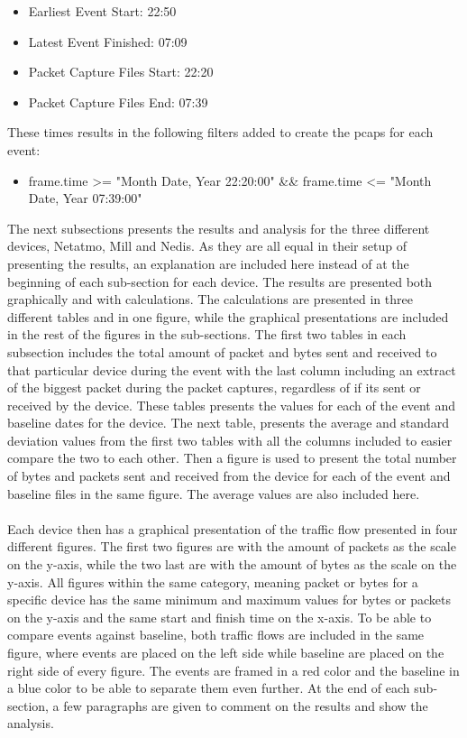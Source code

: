 \begin{itemize}
    \item Earliest Event Start: 22:50
    \item Latest Event Finished: 07:09
    \item Packet Capture Files Start: 22:20
    \item Packet Capture Files End: 07:39
\end{itemize}

These times results in the following filters added to create the pcaps for each event:
\begin{itemize}
    \item frame.time >= "Month Date, Year 22:20:00" \&\& frame.time <= "Month Date, Year 07:39:00"
\end{itemize}

The next subsections presents the results and analysis for the three different devices, Netatmo, Mill and Nedis. As they are all equal in their setup of presenting the results, an explanation are included here instead of at the beginning of each sub-section for each device. The results are presented both graphically and with calculations. The calculations are presented in three different tables and in one figure, while the graphical presentations are included in the rest of the figures in the sub-sections. The first two tables in each subsection includes the total amount of packet and bytes sent and received to that particular device during the event with the last column including an extract of the biggest packet during the packet captures, regardless of if its sent or received by the device. These tables presents the values for each of the event and baseline dates for the device. The next table, presents the average and standard deviation values from the first two tables with all the columns included to easier compare the two to each other. Then a figure is used to present the total number of bytes and packets sent and received from the device for each of the event and baseline files in the same figure. The average values are also included here. 
\\\\
Each device then has a graphical presentation of the traffic flow presented in four different figures. The first two figures are with the amount of packets as the scale on the y-axis, while the two last are with the amount of bytes as the scale on the y-axis. All figures within the same category, meaning packet or bytes for a specific device has the same minimum and maximum values for bytes or packets on the y-axis and the same start and finish time on the x-axis. To be able to compare events against baseline, both traffic flows are included in the same figure, where events are placed on the left side while baseline are placed on the right side of every figure. The events are framed in a red color and the baseline in a blue color to be able to separate them even further. At the end of each sub-section, a few paragraphs are given to comment on the results and show the analysis. 

